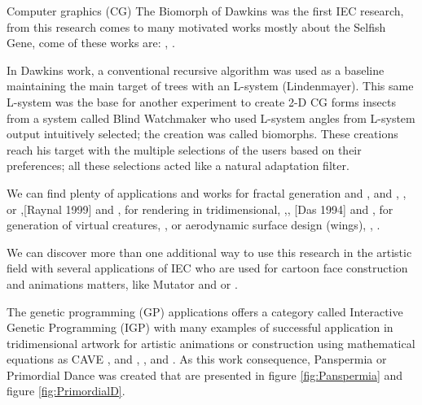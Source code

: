 Computer graphics (CG) The Biomorph of Dawkins was the first IEC research, from
this research comes to many motivated works mostly about the Selfish Gene, come
of these works are:  \cite{ochoa1998genetic},
\cite{mccormack1993interactive}.

In Dawkins work, a conventional recursive algorithm was used as a baseline
maintaining the main target of trees with an L-system (Lindenmayer). This same
L-system was the base for another experiment to create 2-D CG forms insects from
a system called Blind Watchmaker who used L-system angles from L-system output
intuitively selected; the creation was called biomorphs. These creations reach
his target with the multiple selections of the users based on their preferences;
all these selections acted like a natural adaptation filter.

We can find plenty of applications and works for fractal generation and
\cite{sims1992interactive}, \cite{baluja1993simulating} and
\cite{baluja1994towards}, \cite{lund1995artistic}, or
\cite{angeline1996evolving},\cite{raynal1999manipulation}[Raynal 1999] and
\cite{lutton2003artie}, for rendering in tridimensional,
\cite{todd1992artificial},\cite{broughton1997use}, \cite{das1994genetic}[Das
1994] and \cite{tam2002genetic}, for generation of virtual creatures,
\cite{rowland2000evolutionary}, or aerodynamic surface design (wings),
\cite{nguyen1993evolvable}, \cite{nguyen1994evolvable}.

We can discover more than one additional way to use this research in the
artistic field with several applications of IEC who are used for cartoon face
construction and animations matters, like Mutator \cite{todd1994evolutionary}
and \cite{todd1999mutation} or \cite{bentley1999introduction}.

The genetic programming (GP) applications offers a category called Interactive
Genetic Programming (IGP) with many examples of successful application in
tridimensional artwork for artistic animations or construction using
mathematical equations as CAVE \cite{das1994genetic},
\cite{papka1996ubiworld} and \cite{disz1997ubiworld},
\cite{sims1991artificial},
\cite{sims1992interactive} and \cite{min2004creative}. As
this work consequence, Panspermia or Primordial Dance was created that are
presented in figure \ref{fig:Panspermia} and figure \ref{fig:PrimordialD}.

